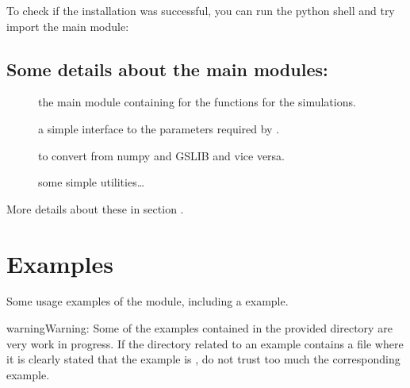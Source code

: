 \documentclass[letterpaper,10pt,english]{sphinxmanual}
\begin{document}
\begin{sphinxVerbatim}[commandchars=\\\{\}]
   
\end{sphinxVerbatim}

To check if the installation was successful, you can run the python shell and try import the
main module:

\begin{sphinxVerbatim}[commandchars=\\\{\}]
 
\end{sphinxVerbatim}


\section{Some details about the main modules:}
\label{\detokenize{installation:some-details-about-the-main-modules}}\begin{description}
\item[{}] \leavevmode
the main module containing for the functions for the  simulations.

\item[{}] \leavevmode
a simple interface to the parameters required by .

\item[{}] \leavevmode
to convert from numpy and GSLIB and vice versa.

\item[{}] \leavevmode
some simple utilities…

\end{description}

More details about these in section {\hyperref[\detokenize{appendices:appendices}]{}}.


\chapter{Examples}
\label{\detokenize{examples:examples}}\label{\detokenize{examples::doc}}
Some usage examples of the  module, including a 
example.

\begin{sphinxadmonition}{warning}{Warning:}
Some of the examples contained in the provided directory
are very work in progress. If the directory related to an
example contains a file  where it is
clearly stated that the example is ,
do not trust too much the corresponding example.
\end{sphinxadmonition}
\end{document}
